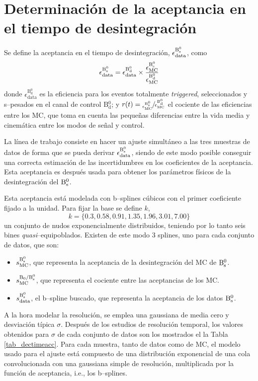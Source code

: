 \section{Determinación de la aceptancia en el tiempo de desintegración}

Se define la aceptancia en el tiempo de desintegración, $ \epsilon_{\text{data}}^{\mathrm{B}{}_{\mathrm{s}}^{0}} $, como
\begin{equation}
  \epsilon_{\text{data}}^{\mathrm{B}{}_{\mathrm{s}}^{0}} = \epsilon_{\text{data}}^{\text{B}{}_{\text{d}}^0} \times  \frac{\epsilon_{\text{MC}}^{\text{B}{}_{\text{s}}^0}}{\epsilon_{\text{MC}}^{\text{B}{}_{\text{d}}^0}}
\end{equation}
donde $\epsilon_{\text{data}}^{\text{B}{}_{\text{d}}^0}$ es la eficiencia para los eventos totalmente \textit{triggered}, seleccionados y s--pesados en el canal de control $\text{B}{}_{\text{d}}^0$; y $r(t) = \sfrac{\epsilon_{\text{MC}}^{\text{B}{}_{\text{s}}^0}}{\epsilon_{\text{MC}}^{\text{B}{}_{\text{d}}^0}}$ el cociente de las eficiencias entre los MC, que toma en cuenta las pequeñas diferencias entre la vida media y cinemática entre los modos de señal y control.

La línea de trabajo consiste en hacer un ajuste simultáneo a las tres muestras de datos de forma que se pueda derivar $\epsilon_{\text{data}}^{\mathrm{B}{}_{\mathrm{s}}^{0}} $, siendo de este modo posible conseguir una correcta estimación de las incertidumbres en los coeficientes de la aceptancia. Esta aceptancia es después usada para obtener los parámetros físicos de la desintegración del $\mathrm{B}{}_{\mathrm{s}}^{0}$.

Esta aceptancia está modelada con b--splines cúbicos con el primer coeficiente fijado a la unidad. Para fijar la base se define $k$,
\[k = \{0.3, 0.58, 0.91, 1.35, 1.96, 3.01,7.00\}\]
un conjunto de nudos exponencialmente distribuidos, teniendo por lo tanto seis bines \emph{quasi}--equipoblados. Existen de este modo $3$ splines, uno para cada conjunto de datos, que son:
\begin{itemize}
	\item $s_{\text{MC}}^{\mathrm{B}{}_{\mathrm{s}}^{0}}$, que representa la aceptancia de la desintegración del MC de $\mathrm{B}{}_{\mathrm{s}}^{0}$.
	\item $s_{\text{MC}}^{\mathrm{B_0}/\mathrm{B}{}_{\mathrm{s}}^{0}}$, que representa el cociente entre las aceptancias de los MC.
	\item $s_{\text{data}}^{\mathrm{B}{}_{\mathrm{s}}^{0}}$, el b--spline buscado, que representa la aceptancia de los datos $\mathrm{B}{}_{\mathrm{s}}^{0}$. 
\end{itemize}


A la hora modelar la resolución, se emplea una gaussiana de media cero y desviación típica $\sigma$. Después de los estudios de resolución temporal, los valores obtenidos para $\sigma$ de cada conjunto de datos son los mostrados el la Tabla \ref{tab_dectimeacc}.
Para cada muestra, tanto de datos como de MC, el modelo usado para el ajuste está compuesto de una distribución exponencial de una cola convolucionada con una gaussiana simple de resolución, multiplicada por la función de aceptancia, i.e., los b--splines.

